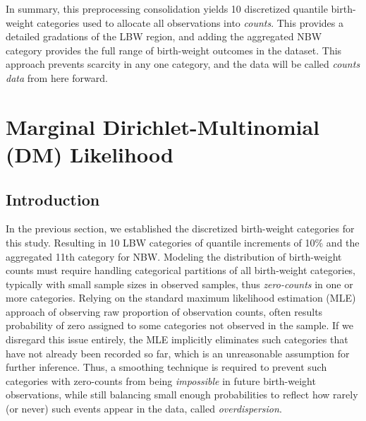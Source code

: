 In summary, this preprocessing consolidation yields 10 discretized quantile birth-weight categories used to allocate all observations into \emph{counts}. This provides a detailed gradations of the LBW region, and adding the aggregated NBW category provides the full range of birth-weight outcomes in the dataset. This approach prevents scarcity in any one category, and the data will be called \emph{counts data} from here forward.

\section{Marginal Dirichlet-Multinomial (DM) Likelihood}
\label{sec:ch2-likelihood}
\subsection{Introduction}
\label{sec:ch2-likelihood-introduction}

In the previous section, we established the discretized birth-weight categories for this study. Resulting in 10 LBW categories of quantile increments of 10\% and the aggregated 11th category for NBW. Modeling the distribution of birth-weight counts must require handling categorical partitions of all birth-weight categories, typically with small sample sizes in observed samples, thus \emph{zero-counts} in one or more categories. Relying on the standard maximum likelihood estimation (MLE) approach of observing raw proportion of observation counts, often results probability of zero assigned to some categories not observed in the sample. If we disregard this issue entirely, the MLE implicitly eliminates such categories that have not already been recorded so far, which is an unreasonable assumption for further inference. Thus, a smoothing technique is required to prevent such categories with zero-counts from being \emph{impossible} in future birth-weight observations, while still balancing small enough probabilities to reflect how rarely (or never) such events appear in the data, called \emph{overdispersion}. 

